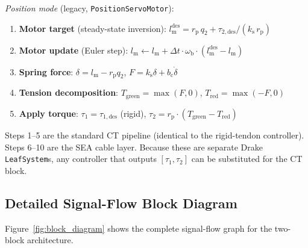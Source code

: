\documentclass[11pt,a4paper]{article}
\newcommand{\rp}{r_{\mathrm{p}}}
\newcommand{\lm}{l_{\mathrm{m}}}
\newcommand{\ks}{k_{\mathrm{s}}}
\newcommand{\bc}{b_{\mathrm{c}}}
\newcommand{\wb}{\omega_{\mathrm{b}}}
\begin{document}
\textit{Position mode} (legacy, \texttt{PositionServoMotor}):
\begin{enumerate}[leftmargin=2em, start=6]
    \item \textbf{Motor target} (steady-state inversion): $\lm^{\mathrm{des}} = \rp \, q_2 + \tau_{2,\mathrm{des}} / (\ks \, \rp)$
    \item \textbf{Motor update} (Euler step): $\lm \gets \lm + \Delta t \cdot \wb \cdot (\lm^{\mathrm{des}} - \lm)$
    \item \textbf{Spring force}: $\delta = \lm - \rp q_2$, \quad $F = \ks \delta + \bc \dot{\delta}$
    \item \textbf{Tension decomposition}: $T_{\mathrm{green}} = \max(F, 0)$, \quad $T_{\mathrm{red}} = \max(-F, 0)$
    \item \textbf{Apply torque}: $\tau_1 = \tau_{1,\mathrm{des}}$ (rigid), \quad $\tau_2 = \rp \cdot (T_{\mathrm{green}} - T_{\mathrm{red}})$
\end{enumerate}

Steps 1--5 are the standard CT pipeline (identical to the rigid-tendon controller).  Steps 6--10 are the SEA cable layer.  Because these are separate Drake \texttt{LeafSystem}s, any controller that outputs $[\tau_1, \tau_2]$ can be substituted for the CT block.


\subsection{Detailed Signal-Flow Block Diagram}
\label{sec:block_diagram}

Figure~\ref{fig:block_diagram} shows the complete signal-flow graph for the two-block architecture.
\end{document}
